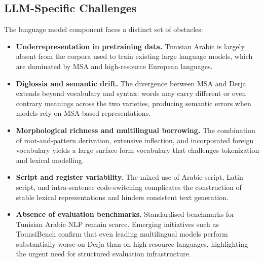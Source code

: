 \documentclass[12pt,a4paper]{report}
\begin{document}
\subsection{LLM-Specific Challenges}

The language model component faces a distinct set of obstacles:

\begin{itemize}
    \item \textbf{Underrepresentation in pretraining data.} Tunisian Arabic is largely
          absent from the corpora used to train existing large language models, which are
          dominated by MSA and high-resource European languages.

    \item \textbf{Diglossia and semantic drift.} The divergence between MSA and Derja
          extends beyond vocabulary and syntax: words may carry different or even contrary
          meanings across the two varieties, producing semantic errors when models rely
          on MSA-based representations.

    \item \textbf{Morphological richness and multilingual borrowing.} The combination of
          root-and-pattern derivation, extensive inflection, and incorporated foreign
          vocabulary yields a large surface-form vocabulary that challenges tokenization
          and lexical modelling.

    \item \textbf{Script and register variability.} The mixed use of Arabic script, Latin
          script, and intra-sentence code-switching complicates the construction of stable
          lexical representations and hinders consistent text generation.

    \item \textbf{Absence of evaluation benchmarks.} Standardised benchmarks for
          Tunisian Arabic NLP remain scarce. Emerging initiatives such as
          TounsiBench confirm that even leading multilingual models perform substantially
          worse on Derja than on high-resource languages, highlighting the urgent need for
          structured evaluation infrastructure.
\end{itemize}
\end{document}
